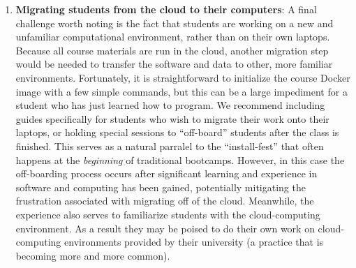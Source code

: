 \begin{enumerate}
\item {\bf Migrating students from the cloud to their computers}: A final
challenge worth noting is the fact that students are working on a new and
unfamiliar computational environment, rather than on their own laptops. Because
all course materials are run in the cloud, another migration step would be
needed to transfer the software and data to other, more familiar environments.
Fortunately, it is straightforward to initialize the course Docker image with a
few simple commands, but this can be a large impediment for a student who has
just learned how to program. We recommend including guides specifically for
students who wish to migrate their work onto their laptops, or holding special
sessions to ``off-board'' students after the class is finished. This serves as a
natural parralel to the ``install-fest'' that often happens at the
\emph{beginning} of traditional bootcamps. However, in this case the
off-boarding process occurs after significant learning and experience in
software and computing has been gained, potentially mitigating the frustration
associated with migrating off of the cloud. Meanwhile, the experience also
serves to familiarize students with the cloud-computing environment. As a result
they may be poised to do their own work on cloud- computing environments
provided by their university (a practice that is becoming more and more common).

\end{enumerate}
